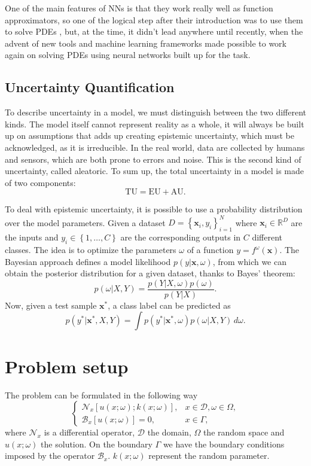 \documentclass[11pt,a4paper]{article}
\begin{document}
One of the main features of NNs is that they work really well as function approximators, so one of the logical step after their introduction was to use them to solve PDEs \cite{Lagaris_1998}, but, at the time, it didn't lead anywhere until recently, when the advent of new tools and machine learning frameworks made possible to work again on solving PDEs using neural networks built up for the task.
\subsection{Uncertainty Quantification}
To describe uncertainty in a model, we must distinguish between the two different kinds. The model itself cannot represent reality as a whole, it will always be built up on assumptions that adds up creating epistemic uncertainty, which must be acknowledged, as it is irreducible. In the real world, data are collected by humans and sensors, which are both prone to errors and noise. This is the second kind of uncertainty, called aleatoric. To sum up, the total uncertainty in a model is made of two components:
\[
    \text{TU} = \text{EU} + \text{AU}.
\]

To deal with epistemic uncertainty, it is possible to use a probability distribution over the model parameters. Given a dataset \(D = \left\{ \bm{x}_i, y_i \right\}^N_{i=1}\) where \(\bm{x}_i \in \mathbb{R}^D\) are the inputs and \(y_i \in \left\{ 1,\ldots, C \right\}\) are the corresponding outputs in \(C\) different classes. The idea is to optimize the parameters \(\omega\) of a function \(y = f^\omega(\bm{x})\). The Bayesian approach defines a model likelihood \(p(y\vert\bm{x}, \omega)\), from which we can obtain the posterior distribution for a given dataset, thanks to Bayes' theorem:
\[
    p(\omega \vert X, Y) = \frac{p(Y\vert X, \omega)p(\omega)}{p(Y\vert X)}.
\]
Now, given a test sample \(\bm{x}^*\), a class label can be predicted as 
\[
    p(y^*\vert \bm{x}^*, X, Y) = \int p(y^*\vert\bm{x}^*, \omega) p(\omega \vert X, Y) \, d\omega.
\]

\section{Problem setup}
The problem can be formulated in the following way
\begin{equation}
    \begin{cases}
        \mathcal{N}_x\left[ u(x;\omega); k(x;\omega) \right], & x \in \mathcal{D}, \omega \in \Omega, \\
        \mathcal{B}_x\left[ u(x;\omega) \right] = 0, & x \in \Gamma,
    \end{cases}
    \label{problem_setup}
\end{equation}
where \(\mathcal{N}_x\) is a differential operator, \(\mathcal{D}\) the domain, \(\Omega\) the random space and \(u(x;\omega)\) the solution. On the boundary \(\Gamma\) we have the boundary conditions imposed by the operator \(\mathcal{B}_x\). \(k(x;\omega)\) represent the random parameter.
\end{document}
